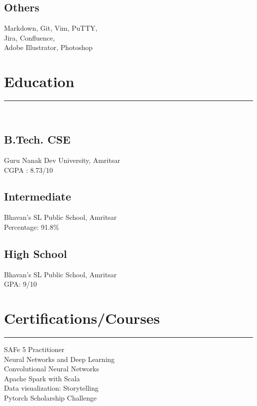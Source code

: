\documentclass[]{puneet-resume}
\begin{document}
\begin{minipage}[t]{0.33\textwidth}
\subsection{Others}
Markdown, Git, Vim, PuTTY,\\
Jira, Confluence,\\
Adobe Illustrator, Photoshop
\sectionsep
\section{Education} 
\noindent\rule{5cm}{0.4pt}\\
\subsection{B.Tech. CSE}
Guru Nanak Dev University, Amritsar\\
CGPA : 8.73/10\\
\vspace{8pt}
\subsection{Intermediate}
Bhavan's SL Public School, Amritsar\\
Percentage: 91.8\%\\
\vspace{8pt}
\subsection{High School}
Bhavan's SL Public School, Amritsar\\
GPA: 9/10
\sectionsep
\section{Certifications/Courses}
\noindent\rule{5cm}{0.4pt}

SAFe 5 Practitioner\\
Neural Networks and Deep Learning\\
Convolutional Neural Networks\\
Apache Spark with Scala\\
Data visualization: Storytelling\\
Pytorch Scholarship Challenge
\sectionsep
%
%

\end{minipage} 
\end{document}
